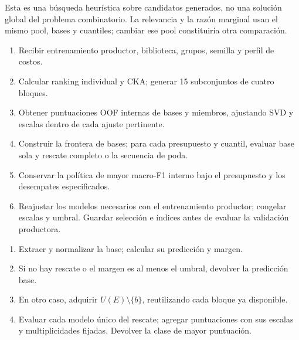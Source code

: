Esta es una búsqueda heurística sobre candidatos generados, no una solución global del problema combinatorio. La relevancia y la razón marginal usan el mismo pool, bases y cuantiles; cambiar ese pool constituiría otra comparación.

\begin{table}[H]
\centering
\caption{Procedimiento de selección dentro de un entrenamiento productor. La validación productora no interviene en estos pasos.}
\label{tab:algoritmo-entrenamiento}
\begin{minipage}{0.95\textwidth}\small
\begin{enumerate}
\item Recibir entrenamiento productor, biblioteca, grupos, semilla y perfil de costos.
\item Calcular ranking individual y CKA; generar 15 subconjuntos de cuatro bloques.
\item Obtener puntuaciones OOF internas de bases y miembros, ajustando SVD y escalas dentro de cada ajuste pertinente.
\item Construir la frontera de bases; para cada presupuesto y cuantil, evaluar base sola y rescate completo o la secuencia de poda.
\item Conservar la política de mayor macro-F1 interno bajo el presupuesto y los desempates especificados.
\item Reajustar los modelos necesarios con el entrenamiento productor; congelar escalas y umbral. Guardar selección e índices antes de evaluar la validación productora.
\end{enumerate}
\end{minipage}
\end{table}

\begin{table}[H]
\centering
\caption{Especificación de inferencia de la política seleccionada. El piloto la evalúa sobre puntuaciones guardadas; la ejecución física completa del híbrido no ha sido medida.}
\label{tab:algoritmo-inferencia}
\begin{minipage}{0.95\textwidth}\small
\begin{enumerate}
\item Extraer y normalizar la base; calcular su predicción y margen.
\item Si no hay rescate o el margen es al menos el umbral, devolver la predicción base.
\item En otro caso, adquirir $U(E)\setminus\{b\}$, reutilizando cada bloque ya disponible.
\item Evaluar cada modelo único del rescate; agregar puntuaciones con sus escalas y multiplicidades fijadas. Devolver la clase de mayor puntuación.
\end{enumerate}
\end{minipage}
\end{table}
\FloatBarrier

